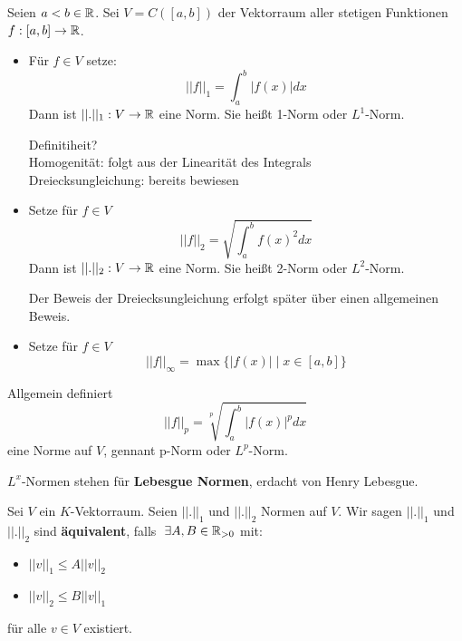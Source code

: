 \documentclass[main.tex]{subfiles}
\begin{document}
\begin{Beispiel}
  Seien $a < b \in \mathbb{R}$. Sei $V = C([a,b])$ der Vektorraum aller stetigen Funktionen $f:[a,b]\to\mathbb{R}$.
  \begin{itemize}
    \item Für $f\in V$ setze:
      $$||f||_1 = \int_a^b |f(x)| dx$$
      Dann ist $||.||_1 : V \to \mathbb{R}$ eine Norm. Sie heißt 1-Norm oder $L^1$-Norm.
      \begin{Beweis}
        Definitiheit?\\
        Homogenität: folgt aus der Linearität des Integrals \checkmark\\
        Dreiecksungleichung: bereits bewiesen \checkmark
      \end{Beweis}

    \item Setze für $f \in V$
      $$||f||_2 = \sqrt{\int_a^b f(x)^2 dx}$$
      Dann ist $||.||_2 : V \to \mathbb{R}$ eine Norm. Sie heißt 2-Norm oder $L^2$-Norm.
      \begin{Beweis}
        Der Beweis der Dreiecksungleichung erfolgt später über einen allgemeinen Beweis.
      \end{Beweis}

    \item Setze für $f \in V$
      $$||f||_\infty = \max\{|f(x)| \mid x \in [a,b] \}$$
  \end{itemize}
  \begin{Theorem}
    Allgemein definiert
    $$||f||_p = \sqrt[p]{\int_a^b |f(x)|^p dx}$$
    eine Norme auf $V$, gennant p-Norm oder $L^p$-Norm.
  \end{Theorem}
\end{Beispiel}

\begin{Bemerkung}
  $L^x$-Normen stehen für \textbf{Lebesgue Normen}, erdacht von Henry Lebesgue.
\end{Bemerkung}

\begin{Definition}
  Sei $V$ ein $K$-Vektorraum. Seien $||.||_1$ und $||.||_2$ Normen auf $V$. Wir sagen $||.||_1$ und $||.||_2$ sind \textbf{äquivalent}, falls $\;\exists A, B \in \mathbb{R}_{>0}$ mit:
  \begin{itemize}
    \item $||v||_1 \leq A ||v||_2$
    \item $||v||_2 \leq B ||v||_1$
  \end{itemize}
  für alle $v \in V$ existiert.
\end{Definition}
\end{document}

